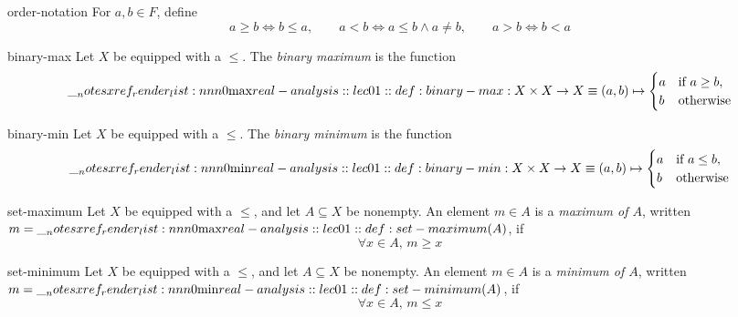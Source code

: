 \documentclass[12pt]{article}
\begin{document}
\begin{conv}{order-notation}
For \(a,b\in F\), define
\[
  a\geq b\iff b\leq a,\qquad
  a<b\iff a\leq b\land a\neq b,\qquad
  a>b\iff b<a
\]
\end{conv}

\begin{dfn}{binary-max}
  Let \(X\) be equipped with a  \(\leq\).
  The \emph{binary maximum} is the function
  \[
    \max : X\times X\to X \defeq (a,b)\map
    \begin{cases}
      a & \text{if } a \geq b, \\
      b & \text{otherwise}
    \end{cases}
  \]
  \par\smallskip{}
\end{dfn}

\begin{dfn}{binary-min}
  Let \(X\) be equipped with a  \(\leq\).
  The \emph{binary minimum} is the function
  \[
    \min : X\times X\to X \defeq (a,b)\map
    \begin{cases}
      a & \text{if } a \leq b, \\
      b & \text{otherwise}
    \end{cases}
  \]
  \par\smallskip{}
\end{dfn}

\begin{dfn}{set-maximum}
  Let \(X\) be equipped with a  \(\leq\), and let \(A \subseteq X\) be nonempty. An element \(m \in A\) is a \emph{maximum of \(A\)}, written \(m = \setmax(A)\), if
  \[
    \forall x \in A,\, m \geq x
  \]
  \par\smallskip{}
\end{dfn}

\begin{dfn}{set-minimum}
  Let \(X\) be equipped with a  \(\leq\), and let \(A \subseteq X\) be nonempty. An element \(m \in A\) is a \emph{minimum of \(A\)}, written \(m = \setmin(A)\), if
  \[
    \forall x \in A,\, m \leq x
  \]
  \par\smallskip{}
\end{dfn}
\end{document}
